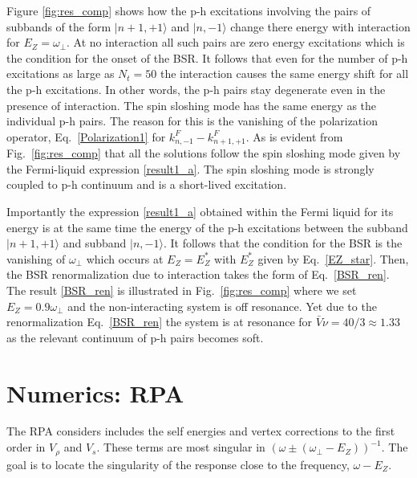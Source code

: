 Figure \ref{fig:res_comp} shows how the p-h excitations involving the pairs of subbands of the form $|n+1,+1\rangle$ and $|n,-1\rangle$ change there energy with interaction for $E_Z = \omega_{\perp}$.
At no interaction all such pairs are zero energy excitations which is the condition for the onset of the BSR.
It follows that even for the number of p-h excitations as large as $N_t=50$ the interaction causes the same energy shift for all the p-h excitations.
In other words, the p-h pairs stay degenerate even in the presence of interaction.
The spin sloshing mode has the same energy as the individual p-h pairs.
The reason for this is the vanishing of the polarization operator, Eq.~\eqref{Polarization1} for $k^F_{n,-1} - k^F_{n+1,+1}$.
As is evident from Fig.~\ref{fig:res_comp} that all the solutions follow the spin sloshing mode given by the Fermi-liquid expression \eqref{result1_a}. 
The spin sloshing mode is strongly coupled to p-h continuum and is a short-lived excitation.

Importantly the expression \eqref{result1_a} obtained within the Fermi liquid for its energy is at the same time the energy of the p-h excitations between the subband $|n+1,+1\rangle$ and subband $|n,-1\rangle$.
It follows that the condition for the BSR is the vanishing of $\omega_{\perp}$ 
which occurs at $E_Z = E_Z^*$ with $E_Z^*$ given by Eq.~\eqref{EZ_star}.
Then, the BSR renormalization due to interaction takes the form of Eq.~\eqref{BSR_ren}.
The result \eqref{BSR_ren} is illustrated in Fig.~\ref{fig:res_comp} where we set $E_Z = 0.9 \omega_{\perp}$ and the non-interacting system is off resonance.
Yet due to the renormalization Eq.~\eqref{BSR_ren} the system is at resonance for $\bar{V} \nu = 40/3 \approx 1.33$ as the relevant continuum of p-h pairs becomes soft.

%
%
%
\section{Numerics: RPA}
%
The RPA considers includes the self energies and vertex corrections to the first order in $V_{\rho}$ and $V_s$.
These terms are most singular in $(\omega \pm (\omega_{\perp} - E_Z))^{-1}$.
The goal is to locate the singularity of the response close to the frequency,
$\omega - E_Z$.
%
